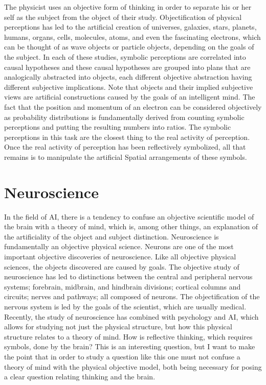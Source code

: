 The physicist uses an objective form of thinking in order to separate
his or her self as the subject from the object of their study.
Objectification of physical perceptions has led to the artificial
creation of universes, galaxies, stars, planets, humans, organs,
cells, molecules, atoms, and even the fascinating electrons, which can
be thought of as wave objects or particle objects, depending on the
goals of the subject.  In each of these studies, symbolic perceptions
are correlated into causal hypotheses and these causal hypotheses are
grouped into plans that are analogically abstracted into objects, each
different objective abstraction having different subjective
implications.  Note that objects and their implied subjective views
are artificial constructions caused by the goals of an intelligent
mind.  The fact that the position and momentum of an electron can be
considered objectively as probability distributions is fundamentally
derived from counting symbolic perceptions and putting the resulting
numbers into ratios.  The symbolic perceptions in this task are the
closest thing to the real activity of perception.  Once the real
activity of perception has been reflectively symbolized, all that
remains is to manipulate the artificial Spatial arrangements of these
symbols.

\section{Neuroscience}

In the field of AI, there is a tendency to confuse an objective
scientific model of the brain with a theory of mind, which is, among
other things, an explanation of the artificiality of the object and
subject distinction.  Neuroscience is fundamentally an objective
physical science.  Neurons are one of the most important objective
discoveries of neuroscience.  Like all objective physical sciences,
the objects discovered are caused by goals.  The objective study of
neuroscience has led to distinctions between the central and
peripheral nervous systems; forebrain, midbrain, and hindbrain
divisions; cortical columns and circuits; nerves and pathways; all
composed of neurons.  The objectification of the nervous system is led
by the goals of the scientist, which are usually medical.  Recently,
the study of neuroscience has combined with psychology and AI, which
allows for studying not just the physical structure, but how this
physical structure relates to a theory of mind.  How is reflective
thinking, which requires symbols, done by the brain?  This is an
interesting question, but I want to make the point that in order to
study a question like this one must not confuse a theory of mind with
the physical objective model, both being necessary for posing a clear
question relating thinking and the brain.

